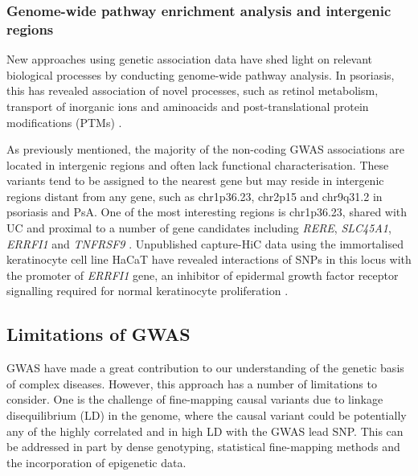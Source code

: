 \subsubsection{Genome-wide pathway enrichment analysis and intergenic regions}

New approaches using genetic association data have shed light on relevant biological processes by conducting genome-wide pathway analysis. %
In psoriasis, this has revealed association of novel processes, such as retinol metabolism, transport of inorganic ions and aminoacids and post-translational protein modifications (PTMs) \parencite{Aterido2016}. 

As previously mentioned, the majority of the non-coding GWAS associations are located in intergenic regions and often lack functional characterisation. These variants tend to be assigned to the nearest gene but may reside in intergenic regions distant from any gene, such as chr1p36.23, chr2p15 and chr9q31.2 in psoriasis and PsA. One of the most interesting regions is chr1p36.23, shared with UC and proximal to a number of gene candidates including \textit{RERE}, \textit{SLC45A1}, \textit{ERRFI1} and \textit{TNFRSF9} \parencite{Tsoi2012}. Unpublished capture-HiC data using the immortalised keratinocyte cell line HaCaT have revealed interactions of SNPs in this locus with the promoter of  \textit{ERRFI1} gene, an inhibitor of epidermal growth factor receptor signalling required for normal keratinocyte proliferation \parencite{Ray-Jones2017}. %

 

  

\subsection{Limitations of GWAS}

GWAS have made a great contribution to our understanding of the genetic basis of complex diseases. However, this approach has a number of limitations to consider.  One is the challenge of fine-mapping causal variants due to linkage disequilibrium (LD) in the genome, where the causal variant could be potentially any of the highly correlated and in high LD with the GWAS lead SNP. This can be addressed in part by dense genotyping, statistical fine-mapping methods and the incorporation of epigenetic data. 

